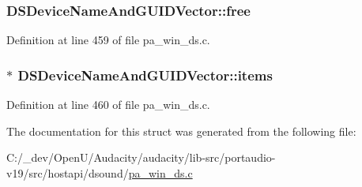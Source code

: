 \subsubsection[{\texorpdfstring{free}{free}}]{ D\+S\+Device\+Name\+And\+G\+U\+I\+D\+Vector\+::free}\hypertarget{struct_d_s_device_name_and_g_u_i_d_vector_a8a1a70007667048fcfbd3cf6415aa3ad}{}\label{struct_d_s_device_name_and_g_u_i_d_vector_a8a1a70007667048fcfbd3cf6415aa3ad}


Definition at line 459 of file pa\+\_\+win\+\_\+ds.\+c.

\subsubsection[{\texorpdfstring{items}{items}}]{$\ast$ D\+S\+Device\+Name\+And\+G\+U\+I\+D\+Vector\+::items}\hypertarget{struct_d_s_device_name_and_g_u_i_d_vector_ae2afb469c948edb3314d3f1cc204a8bc}{}\label{struct_d_s_device_name_and_g_u_i_d_vector_ae2afb469c948edb3314d3f1cc204a8bc}


Definition at line 460 of file pa\+\_\+win\+\_\+ds.\+c.



The documentation for this struct was generated from the following file\+:\begin{DoxyCompactItemize}
\item 
C\+:/\+\_\+dev/\+Open\+U/\+Audacity/audacity/lib-\/src/portaudio-\/v19/src/hostapi/dsound/\hyperlink{pa__win__ds_8c}{pa\+\_\+win\+\_\+ds.\+c}\end{DoxyCompactItemize}
